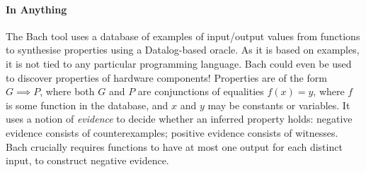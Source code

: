 \paragraph{In Anything}
The Bach\cite{smith2017} tool uses a database of examples of
input/output values from functions to synthesise properties using a
Datalog-based oracle.  As it is based on examples, it is not tied to
any particular programming language.  Bach could even be used to
discover properties of hardware components!  Properties are of the
form $G \implies P$, where both $G$ and $P$ are conjunctions of
equalities $f(x) = y$, where $f$ is some function in the database, and
$x$ and $y$ may be constants or variables.  It uses a notion of
\emph{evidence} to decide whether an inferred property holds: negative
evidence consists of counterexamples; positive evidence consists of
witnesses.  Bach crucially requires functions to have at most one
output for each distinct input, to construct negative evidence.
